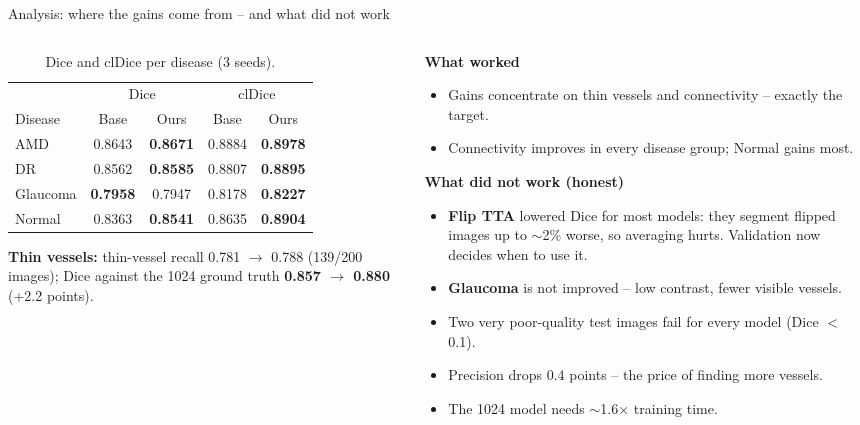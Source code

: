 \documentclass[aspectratio=169,10pt]{beamer}
\begin{document}
\begin{frame}{Analysis: where the gains come from -- and what did not work}
  \begin{columns}[T]
    \begin{column}{0.48\textwidth}
      \begin{table}
        \caption{Dice and clDice per disease (3 seeds).}
        \footnotesize
        \begin{tabular}{@{}lcccc@{}}
          \toprule
          & \multicolumn{2}{c}{Dice} & \multicolumn{2}{c}{clDice} \\
          Disease & Base & Ours & Base & Ours \\
          \midrule
          AMD & 0.8643 & \textbf{0.8671} & 0.8884 & \textbf{0.8978} \\
          DR & 0.8562 & \textbf{0.8585} & 0.8807 & \textbf{0.8895} \\
          Glaucoma & \textbf{0.7958} & 0.7947 & 0.8178 & \textbf{0.8227} \\
          Normal & 0.8363 & \textbf{0.8541} & 0.8635 & \textbf{0.8904} \\
          \bottomrule
        \end{tabular}
      \end{table}
      \footnotesize
      \textbf{Thin vessels:} thin-vessel recall 0.781 $\rightarrow$ 0.788 (139/200 images); Dice against the 1024 ground truth \textbf{0.857 $\rightarrow$ 0.880} (+2.2 points).
    \end{column}
    \begin{column}{0.5\textwidth}
      \textbf{What worked}
      \begin{itemize}\setlength\itemsep{1pt}\footnotesize
        \item Gains concentrate on thin vessels and connectivity -- exactly the target.
        \item Connectivity improves in every disease group; Normal gains most.
      \end{itemize}
      \textbf{What did not work (honest)}
      \begin{itemize}\setlength\itemsep{1pt}\footnotesize
        \item \textbf{Flip TTA} lowered Dice for most models: they segment flipped images up to $\sim$2\% worse, so averaging hurts. Validation now decides when to use it.
        \item \textbf{Glaucoma} is not improved -- low contrast, fewer visible vessels.
        \item Two very poor-quality test images fail for every model (Dice $<$ 0.1).
        \item Precision drops 0.4 points -- the price of finding more vessels.
        \item The 1024 model needs $\sim$1.6$\times$ training time.
      \end{itemize}
    \end{column}
  \end{columns}
\end{frame}
\end{document}
